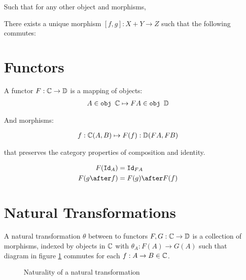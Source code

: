 \documentclass{Report}
\begin{document}
Such that for any other object and morphisms,


There exists a unique morphism $[f, g]: X + Y \rightarrow Z $ such that the following commutes:





\section{Functors}
A functor $F: \mathbb{C} \rightarrow \mathbb{D}$ is a mapping of objects:
\begin{align}
    A\in\texttt{obj }\mathbb{C} \mapsto FA \in \texttt{obj }\mathbb{D}
\end{align}

And morphisms:

\begin{align}
    f: \mathbb{C}(A, B) \mapsto F(f): \mathbb{D}(FA, FB)
\end{align}

that preserves the category properties of composition and identity.

\begin{align}
    F(\Id{A}) & = \Id{FA} \\
    F(g\after f) & = F(g)\after F(f)
\end{align}

\section{Natural Transformations}

A natural transformation $\theta$ between to functors $F, G: \mathbb{C} \rightarrow \mathbb{D}$ is a collection of morphisms, indexed by objects in $\mathbb{C}$ with  $\theta_A: F(A) \rightarrow G(A)$ such that diagram in figure \ref{Naturality} commutes for each $f: A \rightarrow B \in \mathbb{C}$.

\begin{figure}
    \centering
    \begin{minipage}{0.45\textwidth}
        \centering
        \caption{Naturality of a natural transformation}
        \label{Naturality}
    \end{minipage}\hfill
\end{figure}
\end{document}
